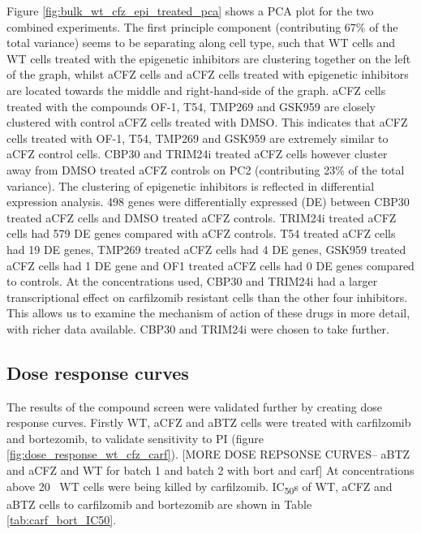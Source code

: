 Figure \ref{fig:bulk_wt_cfz_epi_treated_pca} shows a PCA plot for the two combined experiments.
The first principle component (contributing 67\% of the total variance) seems to be separating along cell type, such that WT cells and WT cells treated with the epigenetic inhibitors are clustering together on the left of the graph, whilst aCFZ cells and aCFZ cells treated with epigenetic inhibitors are located towards the middle and right-hand-side of the graph.
aCFZ cells treated with the compounds OF-1, T54, TMP269 and GSK959 are closely clustered with control aCFZ cells treated with DMSO.
This indicates that aCFZ cells treated with OF-1, T54, TMP269 and GSK959 are extremely similar to aCFZ control cells.
CBP30 and TRIM24i treated aCFZ cells however cluster away from DMSO treated aCFZ controls on PC2 (contributing 23\% of the total variance).
The clustering of epigenetic inhibitors is reflected in differential expression analysis.
498 genes were differentially expressed (DE) between CBP30 treated aCFZ cells and DMSO treated aCFZ controls.
TRIM24i treated aCFZ cells had 579 DE genes compared with aCFZ controls.
T54 treated aCFZ cells had 19 DE genes, TMP269 treated aCFZ cells had 4 DE genes, GSK959 treated aCFZ cells had 1 DE gene and OF1 treated aCFZ cells had 0 DE genes compared to controls.
At the concentrations used, CBP30 and TRIM24i had a larger transcriptional effect on carfilzomib resistant cells than the other four inhibitors.
This allows us to examine the mechanism of action of these drugs in more detail, with richer data available.
CBP30 and TRIM24i were chosen to take further.


\subsection{Dose response curves}\label{subsec:dose_response}
The results of the compound screen were validated further by creating dose response curves.
Firstly WT, aCFZ and aBTZ cells were treated with carfilzomib and bortezomib, to validate sensitivity to PI (figure \ref{fig:dose_response_wt_cfz_carf}).
[MORE DOSE REPSONSE CURVES-- aBTZ and aCFZ and WT for batch 1 and batch 2 with bort and carf]
At concentrations above 20\si{\nano\Molar} WT cells were being killed by carfilzomib.
IC\textsubscript{50}s of WT, aCFZ and aBTZ cells to carfilzomib and bortezomib are shown in Table \ref{tab:carf_bort_IC50}.

